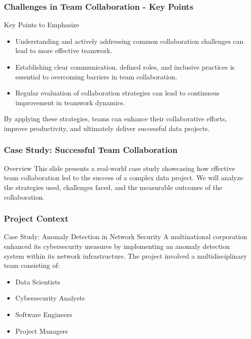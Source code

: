 \documentclass[aspectratio=169]{beamer}
\begin{document}
\begin{frame}[fragile]
    \frametitle{Challenges in Team Collaboration - Key Points}
    \begin{block}{Key Points to Emphasize}
        \begin{itemize}
            \item Understanding and actively addressing common collaboration challenges can lead to more effective teamwork.
            \item Establishing clear communication, defined roles, and inclusive practices is essential to overcoming barriers in team collaboration.
            \item Regular evaluation of collaboration strategies can lead to continuous improvement in teamwork dynamics.
        \end{itemize}
        By applying these strategies, teams can enhance their collaborative efforts, improve productivity, and ultimately deliver successful data projects.
    \end{block}
\end{frame}

\begin{frame}[fragile]
    \frametitle{Case Study: Successful Team Collaboration}
    \begin{block}{Overview}
        This slide presents a real-world case study showcasing how effective team collaboration led to the success of a complex data project. We will analyze the strategies used, challenges faced, and the measurable outcomes of the collaboration.
    \end{block}
\end{frame}

\begin{frame}[fragile]
    \frametitle{Project Context}
    \begin{block}{Case Study: Anomaly Detection in Network Security}
        A multinational corporation enhanced its cybersecurity measures by implementing an anomaly detection system within its network infrastructure. The project involved a multidisciplinary team consisting of:
        \begin{itemize}
            \item Data Scientists
            \item Cybersecurity Analysts
            \item Software Engineers
            \item Project Managers
        \end{itemize}
    \end{block}
\end{frame}
\end{document}
